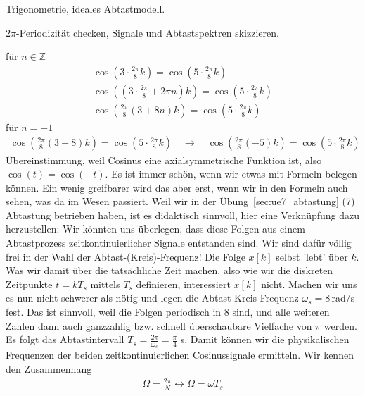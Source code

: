 \begin{Werkzeug}
Trigonometrie, ideales Abtastmodell.
\end{Werkzeug}
\begin{Ansatz}
$2\pi$-Periodizität checken, Signale und Abtastspektren skizzieren.
\end{Ansatz}
\begin{ExCalc}
für $n\in\mathbb{Z}$
\begin{align}
\cos(3\cdot\frac{2\pi}{8}k) = \cos(5\cdot\frac{2\pi}{8}k)\\
\cos\left(\left(3\cdot\frac{2\pi}{8} + 2\pi n\right)k\right) = \cos(5\cdot\frac{2\pi}{8}k)\\
\cos\left(\frac{2\pi}{8}\left(3 + 8 n\right)k\right) = \cos(5\cdot\frac{2\pi}{8}k)
\end{align}
für $n=-1$
\begin{align}
\cos\left(\frac{2\pi}{8}\left(3 - 8\right)k\right) = \cos(5\cdot\frac{2\pi}{8}k)
\quad
\rightarrow
\quad
\cos\left(\frac{2\pi}{8}\left(-5\right)k\right) = \cos(5\cdot\frac{2\pi}{8}k)
\end{align}
Übereinstimmung, weil Cosinus eine axialsymmetrische Funktion ist, also
$\cos(t) = \cos(-t)$.
%
Es ist immer schön, wenn wir etwas mit Formeln belegen können.
%
Ein wenig greifbarer wird das aber erst, wenn wir in den Formeln auch sehen,
was da im Wesen passiert.
%
Weil wir in der Übung~\ref{sec:ue7_abtastung} (7) Abtastung betrieben haben, ist es didaktisch sinnvoll,
hier eine Verknüpfung dazu herzustellen: Wir könnten uns überlegen, dass diese
Folgen aus einem Abtastprozess zeitkontinuierlicher Signale entstanden
sind.
%
Wir sind dafür völlig frei in der Wahl der Abtast-(Kreis)-Frequenz!
%
Die Folge $x[k]$ selbst 'lebt' über $k$.
%
Was wir damit über die tatsächliche Zeit machen, also wie wir die diskreten Zeitpunkte
$t=k T_s$ mittels $T_s$ definieren, interessiert $x[k]$ nicht.
%
Machen wir uns es nun nicht schwerer als nötig und legen die Abtast-Kreis-Frequenz
$\omega_s=8$\,rad/s fest. Das ist sinnvoll, weil die Folgen periodisch in 8 sind,
und alle weiteren Zahlen dann auch ganzzahlig bzw. schnell überschaubare
Vielfache von $\pi$ werden.
%
Es folgt das Abtastintervall
$T_s = \frac{2\pi}{\omega_s}=\frac{\pi}{4}$ s.
%
Damit können wir die physikalischen Frequenzen der beiden zeitkontinuierlichen
Cosinussignale ermitteln. Wir kennen den Zusammenhang
\begin{align}
\Omega = \frac{2\pi}{N} \leftrightarrow \Omega = \omega T_s

\end{align}
\end{ExCalc}
